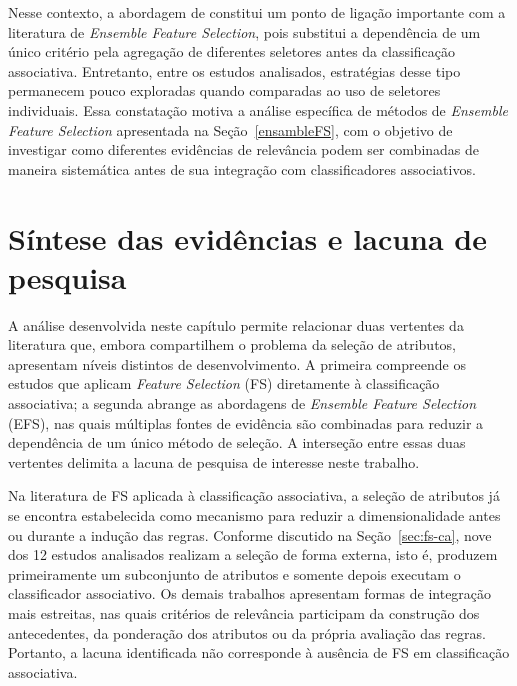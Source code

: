 Nesse contexto, a abordagem de  constitui um ponto
de ligação importante com a literatura de \textit{Ensemble Feature Selection},
pois substitui a dependência de um único critério pela agregação de diferentes
seletores antes da classificação associativa. Entretanto, entre os estudos
analisados, estratégias desse tipo permanecem pouco exploradas quando comparadas
ao uso de seletores individuais. Essa constatação motiva a análise específica
de métodos de \textit{Ensemble Feature Selection} apresentada na
Seção~\ref{ensambleFS}, com o objetivo de investigar como diferentes evidências de
relevância podem ser combinadas de maneira sistemática antes de sua integração
com classificadores associativos.



\section{Síntese das evidências e lacuna de pesquisa}
\label{sec:consideracoes-relacionados}

A análise desenvolvida neste capítulo permite relacionar duas vertentes da
literatura que, embora compartilhem o problema da seleção de atributos, apresentam
níveis distintos de desenvolvimento. A primeira compreende os estudos que aplicam
\textit{Feature Selection} (FS) diretamente à classificação associativa; a segunda
abrange as abordagens de \textit{Ensemble Feature Selection} (EFS), nas quais
múltiplas fontes de evidência são combinadas para reduzir a dependência de um
único método de seleção. A interseção entre essas duas vertentes delimita a lacuna
de pesquisa de interesse neste trabalho.

Na literatura de FS aplicada à classificação associativa, a seleção de atributos já
se encontra estabelecida como mecanismo para reduzir a dimensionalidade antes ou
durante a indução das regras. Conforme discutido na Seção~\ref{sec:fs-ca}, nove
dos 12 estudos analisados realizam a seleção de forma externa, isto é, produzem
primeiramente um subconjunto de atributos e somente depois executam o
classificador associativo. Os demais trabalhos apresentam formas de integração mais
estreitas, nas quais critérios de relevância participam da construção dos
antecedentes, da ponderação dos atributos ou da própria avaliação das regras.
Portanto, a lacuna identificada não corresponde à ausência de FS em classificação
associativa.

